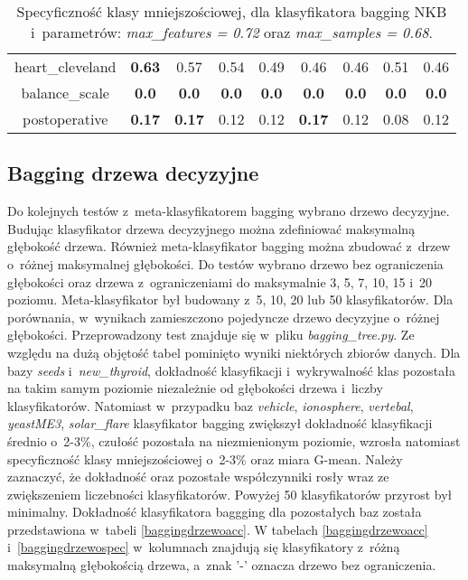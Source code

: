 \begin{table}[H]
\begin{center}
{\begin{tabular}{c|cccccccc}
				heart\_cleveland&\textbf{0.63}&0.57&0.54&0.49&0.46&0.46&0.51&0.46\\%
				balance\_scale&\textbf{0.0}&\textbf{0.0}&\textbf{0.0}&\textbf{0.0}&\textbf{0.0}&\textbf{0.0}&\textbf{0.0}&\textbf{0.0}\\%
				postoperative&\textbf{0.17}&\textbf{0.17}&0.12&0.12&\textbf{0.17}&0.12&0.08&0.12\\%
			\end{tabular}}
			\caption{Specyficzność klasy mniejszościowej, dla klasyfikatora bagging NKB i~parametrów: \textit{max\_features = 0.72} oraz \textit{max\_samples = 0.68}.}
			\label{baggin_spec2}
		\end{center}
	\end{table}
\subsection{Bagging drzewa decyzyjne}
Do kolejnych testów z~meta-klasyfikatorem bagging wybrano drzewo decyzyjne. Budując klasyfikator drzewa decyzyjnego można zdefiniować maksymalną głębokość drzewa. Również meta-klasyfikator bagging można zbudować z~drzew o~różnej maksymalnej głębokości. Do testów wybrano drzewo bez ograniczenia głębokości oraz drzewa z~ograniczeniami do maksymalnie 3, 5, 7, 10, 15 i~20 poziomu. Meta-klasyfikator był budowany z~5, 10, 20 lub 50 klasyfikatorów. Dla porównania, w~wynikach zamieszczono pojedyncze drzewo decyzyjne o~różnej głębokości. Przeprowadzony test znajduje się w~pliku \textit{bagging\_tree.py}. Ze względu na dużą objętość tabel pominięto wyniki niektórych zbiorów danych. Dla bazy \textit{seeds} i~\textit{new\_thyroid}, dokładność klasyfikacji i~wykrywalność klas pozostała na takim samym poziomie niezależnie od głębokości drzewa i~liczby klasyfikatorów. Natomiast w~przypadku baz \textit{vehicle}, \textit{ionosphere}, \textit{vertebal}, \textit{yeastME3}, \textit{solar\_flare} klasyfikator bagging zwiększył dokładność klasyfikacji średnio o~2-3\%, czułość pozostała na niezmienionym poziomie, wzrosła natomiast specyficzność klasy mniejszościowej o~2-3\% oraz miara G-mean. Należy zaznaczyć, że dokładność oraz pozostałe współczynniki rosły wraz ze zwiększeniem liczebności klasyfikatorów. Powyżej 50 klasyfikatorów przyrost był minimalny. Dokładność klasyfikatora baggging dla pozostałych baz została przedstawiona w~tabeli \ref{baggingdrzewoacc}. W tabelach \ref{baggingdrzewoacc} i~\ref{baggingdrzewospec} w~kolumnach znajdują się klasyfikatory z~różną maksymalną głębokością drzewa, a~znak '-' oznacza drzewo bez ograniczenia. 

